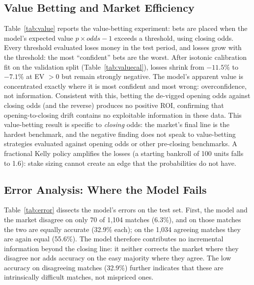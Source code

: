\subsection{Value Betting and Market Efficiency}



Table~\ref{tab:value} reports the value-betting experiment: bets are
placed when the model's expected value $p \times odds - 1$ exceeds a
threshold, using closing odds. Every threshold evaluated loses
money in the test period, and
losses grow with the threshold: the most ``confident'' bets are the
worst. After isotonic calibration fit on the validation split
(Table~\ref{tab:valuecal}), losses shrink from $-11.5\%$ to $-7.1\%$
at EV $>0$ but remain strongly negative. The model's apparent value
is concentrated exactly where it is most confident and most wrong:
overconfidence, not information. Consistent with this, betting the
de-vigged opening odds against closing odds (and the reverse)
produces no positive ROI, confirming that opening-to-closing drift
contains no exploitable information in these data. This
value-betting result is specific to \emph{closing} odds: the market's
final line is the hardest benchmark, and the negative finding does
not speak to value-betting strategies evaluated against opening odds
or other pre-closing benchmarks. A fractional Kelly
policy amplifies the losses (a starting bankroll of 100 units falls
to 1.6): stake sizing cannot create an edge that the probabilities do
not have.

\subsection{Error Analysis: Where the Model Fails}


Table~\ref{tab:error} dissects the model's errors on the test set.
First, the model and the market disagree on only 70 of 1,104 matches
(6.3\%), and on those matches the two are equally accurate (32.9\%
each); on the 1,034 agreeing matches they are again equal (55.6\%).
The model therefore contributes no incremental information beyond the
closing line: it neither corrects the market where they disagree nor
adds accuracy on the easy majority where they agree. The low accuracy
on disagreeing matches (32.9\%) further indicates that these are
intrinsically difficult matches, not mispriced ones.

